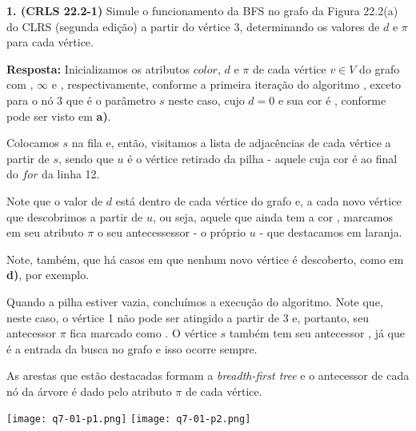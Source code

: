 
\noindent \textbf{1. (CRLS 22.2-1)} Simule o funcionamento da BFS no grafo da Figura 22.2(a) do CLRS (segunda edição) a partir do vértice 3, determinando os valores de $d$ e $\pi$ para cada vértice.

\textbf{Resposta:} Inicializamos os atributos $color$, $d$ e $\pi$ de cada vértice $v \in V$ do grafo com , $\infty$ e , respectivamente, conforme a primeira iteração do algoritmo , exceto para o nó 3 que é o parâmetro $s$ neste caso, cujo $d = 0$ e sua cor é , conforme pode ser visto em \textbf{a)}.

Colocamos $s$ na fila e, então, visitamos a lista de adjacências de cada vértice a partir de $s$, sendo que $u$ é o vértice retirado da pilha - aquele cuja cor é  ao final do $for$ da linha 12.

Note que o valor de $d$ está dentro de cada vértice do grafo e, a cada novo vértice que descobrimos a partir de $u$, ou seja, aquele que ainda tem a cor , marcamos em seu atributo $\pi$ o seu antecessessor - o próprio $u$ - que destacamos em laranja.

Note, também, que há casos em que nenhum novo vértice é descoberto, como em \textbf{d)}, por exemplo.

Quando a pilha estiver vazia, concluímos a execução do algoritmo. Note que, neste caso, o vértice 1 não pode ser atingido a partir de 3 e, portanto, seu antecessor $\pi$ fica marcado como . O vértice $s$ também tem seu antecessor , já que é a entrada da busca no grafo e isso ocorre sempre.

As arestas que estão destacadas formam a \textit{breadth-first tree} e o antecessor de cada nó da árvore é dado pelo atributo $\pi$ de cada vértice.

\begin{center}
\texttt{[image: q7-01-p1.png]}
\texttt{[image: q7-01-p2.png]}
\label{fig:7.1-1}
\end{center}
